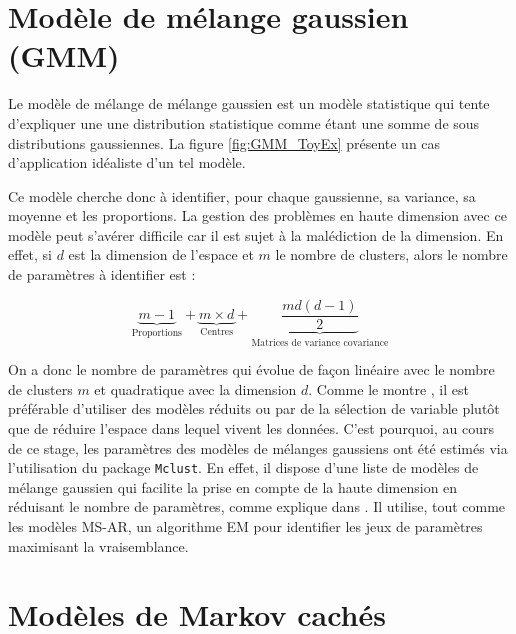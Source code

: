 \documentclass[12pt]{report}
\begin{document}
\section{Modèle de mélange gaussien (GMM)}
\label{sec:Model_GMM}
Le modèle de mélange de mélange gaussien est un modèle statistique qui tente d'expliquer une une distribution statistique comme étant une somme de sous distributions gaussiennes. La figure \ref{fig:GMM_ToyEx} présente un cas d'application idéaliste d'un tel modèle. 




Ce modèle cherche donc à identifier, pour chaque gaussienne, sa variance, sa moyenne et les proportions. La gestion des problèmes en haute dimension avec ce modèle peut s'avérer difficile car il est sujet à la malédiction de la dimension. En effet, si $d$ est la dimension de l'espace et $m$ le nombre de clusters, alors le nombre de paramètres à identifier est :

\begin{equation}
\underbrace{m-1}_\text{Proportions}  + \underbrace{m \times d}_\text{Centres}  +  \underbrace{\frac{md \left(d - 1\right)}{2}}_\text{Matrices de variance covariance}
\label{eq:Model_GMM_ParamNumber} 
\end{equation}

On a donc le nombre de paramètres qui évolue de façon linéaire avec le nombre de clusters $m$ et quadratique avec la dimension $d$. Comme le montre \cite{bouveyron_model-based_2014}, il est préférable d'utiliser des modèles réduits ou par de la sélection de variable plutôt que de réduire l'espace dans lequel vivent les données. C'est pourquoi, au cours de ce stage, les paramètres des modèles de mélanges gaussiens ont été estimés via l'utilisation du package \texttt{Mclust}. En effet, il dispose d'une liste de modèles de mélange gaussien qui facilite la prise en compte de la haute dimension en réduisant le nombre de paramètres, comme explique dans \cite{scrucca_mclust_2016}. Il utilise, tout comme les modèles MS-AR, un algorithme EM pour identifier les jeux de paramètres maximisant la vraisemblance.  

\section{Modèles de Markov cachés}
\end{document}
